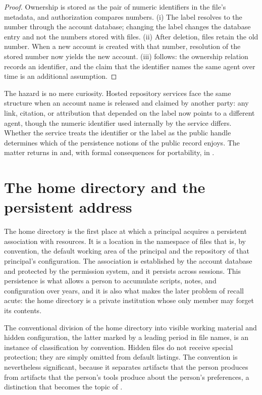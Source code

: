 \documentclass[11pt,twoside,openright]{book}
\theoremstyle{plain}
\theoremstyle{definition}
\theoremstyle{remark}
\begin{document}
\begin{proof}
Ownership is stored as the pair of numeric identifiers in the file's metadata, and authorization compares numbers. (i) The label resolves to the number through the account database; changing the label changes the database entry and not the numbers stored with files. (ii) After deletion, files retain the old number. When a new account is created with that number, resolution of the stored number now yields the new account. (iii) follows: the ownership relation records an identifier, and the claim that the identifier names the same agent over time is an additional assumption.
\end{proof}

The hazard is no mere curiosity. Hosted repository services face the same structure when an account name is released and claimed by another party: any link, citation, or attribution that depended on the label now points to a different agent, though the numeric identifier used internally by the service differs. Whether the service treats the identifier or the label as the public handle determines which of the persistence notions of  the public record enjoys. The matter returns in  and, with formal consequences for portability, in .

\section{The home directory and the persistent address}

The home directory is the first place at which a principal acquires a persistent association with resources. It is a location in the namespace of files that is, by convention, the default working area of the principal and the repository of that principal's configuration. The association is established by the account database and protected by the permission system, and it persists across sessions. This persistence is what allows a person to accumulate scripts, notes, and configuration over years, and it is also what makes the later problem of recall acute: the home directory is a private institution whose only member may forget its contents.

The conventional division of the home directory into visible working material and hidden configuration, the latter marked by a leading period in file names, is an instance of classification by convention. Hidden files do not receive special protection; they are simply omitted from default listings. The convention is nevertheless significant, because it separates artifacts that the person produces from artifacts that the person's tools produce about the person's preferences, a distinction that becomes the topic of .
\end{document}
